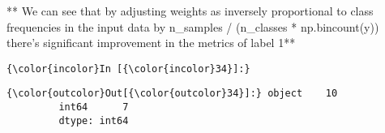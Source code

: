 \documentclass[11pt]{article}
\begin{document}
    ** We can see that by adjusting weights as inversely proportional to
class frequencies in the input data by n\_samples / (n\_classes *
np.bincount(y)) there's significant improvement in the metrics of label
1**

    \begin{Verbatim}[commandchars=\\\{\}]
{\color{incolor}In [{\color{incolor}34}]:} 
\end{Verbatim}


\begin{Verbatim}[commandchars=\\\{\}]
{\color{outcolor}Out[{\color{outcolor}34}]:} object    10
         int64      7
         dtype: int64
\end{Verbatim}
            

    
    
    
    
\end{document}
